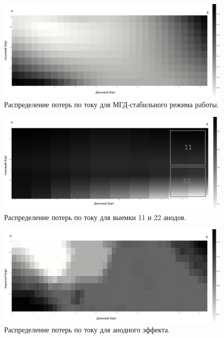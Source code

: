 \documentclass[pdflatex,sn-mathphys-gost]{pmi-jnl}
\begin{document}
\begin{figure}[ht]
    \centering
    \includegraphics[width=150mm]{h.png}
    \caption{Распределение потерь по току для МГД-стабильного режима работы.}
    \label{fig:stabrasp}
\end{figure}

\begin{figure}[ht]
    \centering
    \includegraphics[width=150mm]{выемка анодов.png}
    \caption{Распределение потерь по току для выемки 11 и 22 анодов.}
    \label{fig:viemkaanodrasp} 
\end{figure}

\begin{figure}[ht]
    \centering
    \includegraphics[width=150mm]{анодный эффект.png}
    \caption{Распределение потерь по току для анодного эффекта.}
    \label{fig:anodeffectrasp} 
\end{figure}
\end{document}
